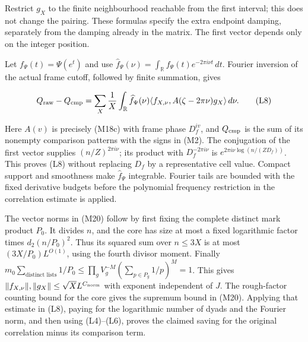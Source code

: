 Restrict \(g_X\) to the finite neighbourhood reachable from the first
interval; this does not change the pairing. These formulas specify the
extra endpoint damping, separately from the damping already in the
matrix. The first vector depends only on the integer position.

Let \(f_\Psi(t)=\Psi(e^t)\) and use
\(\widehat f_\Psi(\nu)=\int_{\mathbb R}f_\Psi(t)e^{-2\pi i\nu t}\,dt\).
Fourier inversion of the actual frame cutoff, followed by finite
summation, gives

\[
Q_{\rm raw}-Q_{\rm cmp}
 =\sum_X\frac1X\int_{\mathbb R}\widehat f_\Psi(\nu)
   \langle f_{X,\nu},A(\zeta-2\pi\nu)g_X\rangle\,d\nu.
\tag{L8}
\]

Here \(A(v)\) is precisely (M18c) with frame phase \(D_f^{iv}\), and
\(Q_{\rm cmp}\) is the sum of its nonempty comparison patterns with the
signs in (M2). The conjugation of the first vector supplies
\((n/Z)^{2\pi i\nu}\); its product with \(D_f^{-2\pi i\nu}\) is
\(e^{2\pi i\nu\log(n/(ZD_f))}\). This proves (L8) without replacing
\(D_f\) by a representative cell value. Compact support and smoothness
make \(\widehat f_\Psi\) integrable. Fourier tails are bounded with the
fixed derivative budgets before the polynomial frequency restriction in
the correlation estimate is applied.

The vector norms in (M20) follow by first fixing the complete distinct
mark product \(P_0\). It divides \(n\), and the core has size at most a
fixed logarithmic factor times \(d_2(n/P_0)^2\). Thus its squared sum
over \(n\le3X\) is at most \((3X/P_0)L^{O(1)}\), using the fourth
divisor moment. Finally
\(m_0\sum_{\text{distinct lists}}1/P_0\le \prod_g V_g^{-M}(\sum_{p\in P_g}1/p)^M=1\).
This gives \(\|f_{X,\nu}\|,\|g_X\|\le\sqrt X L^{C_{\rm norm}}\) with
exponent independent of \(J\). The rough-factor counting bound for the
core gives the supremum bound in (M20). Applying that estimate in (L8),
paying for the logarithmic number of dyads and the Fourier norm, and
then using (L4)--(L6), proves the claimed saving for the original
correlation minus its comparison term.
